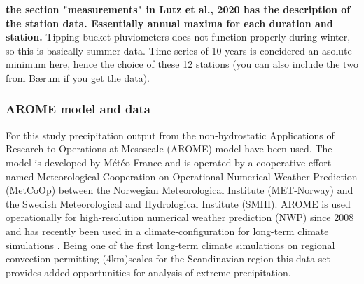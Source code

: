 \textbf{the section "measurements" in Lutz et al., 2020 has the description of the station data. Essentially annual maxima for each duration and station.} Tipping bucket pluviometers does not function properly during winter, so this is basically summer-data. Time series of 10 years is concidered an asolute minimum here, hence the choice of these 12 stations (you can also include the two from Bærum if you get the data). 

\subsubsection{AROME model and data}

For this study precipitation output from the non-hydrostatic Applications of Research to Operations at Mesoscale (AROME)\cite{seity_arome} model have been used. The model is developed by Météo-France and is operated by a cooperative effort named Meteorological Cooperation on Operational Numerical Weather Prediction (MetCoOp) between the Norwegian Meteorological Institute (MET-Norway) and the Swedish Meteorological and Hydrological Institute (SMHI). AROME is used operationally for high-resolution numerical weather prediction (NWP) since 2008 and has recently been used in a climate-configuration for long-term climate simulations \cite{lind_arome]}. Being one of the first long-term climate simulations on regional convection-permitting (\<4km)scales for the Scandinavian region this data-set provides added opportunities for analysis of extreme precipitation. 
\\
\\
